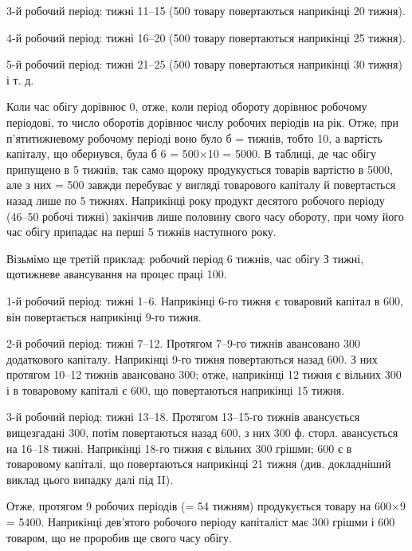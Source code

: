 3-й робочий період: тижні 11--15 (500 товару повертаються
наприкінці 20 тижня).

4-й робочий період: тижні 16--20 (500 товару повертаються
наприкінці 25 тижня).

5-й робочий період: тижні 21--25 (500 товару повертаються
наприкінці 30 тижня) і т. д.

Коли час обігу дорівнює 0, отже, коли період обороту дорівнює
робочому періодові, то число оборотів дорівнює числу робочих періодів
на рік.
Отже, при п’ятитижневому робочому періоді воно було б = 
тижнів, тобто 10, а вартість капіталу, що обернувся, була б 6 = 500×10 =
5000.
В таблиці, де час обігу припущено в 5 тижнів, так само щороку
продукується товарів вартістю в 5000, але з них  = 500 завжди перебуває у вигляді товарового капіталу й повертається
назад лише по 5 тижнях. Наприкінці року продукт десятого робочого
періоду (46--50 робочі тижні) закінчив лише половину свого часу
обороту, при чому його час обігу припадає на перші 5 тижнів наступного року.

Візьмімо ще третій приклад: робочий період 6 тижнів, час обігу
З тижні, щотижневе авансування на процес праці 100.

1-й робочий період: тижні 1--6. Наприкінці 6-го тижня є товаровий
капітал в 600, він повертається наприкінці 9-го тижня.

2-й робочий період: тижні 7--12. Протягом 7--9-го тижнів авансовано
300 додаткового капіталу. Наприкінці 9-го тижня повертаються
назад 600. З них протягом 10--12 тижнів авансовано 300; отже, наприкінці 12 тижня є вільних 300 і в товаровому
капіталі є 600, що повертаються наприкінці 15 тижня.

3-й робочий період: тижні 13--18. Протягом 13--15-го тижнів авансується
вищезгадані 300, потім повертаються назад 600,
з них 300 ф. сторл. авансується на 16--18 тижні. Наприкінці 18-го тижня
є вільних 300 грішми; 600 є в товаровому капіталі,
що повертаються наприкінці 21 тижня (див. докладніший виклад
цього випадку далі під II).

Отже, протягом 9 робочих періодів (= 54 тижням) продукується товару
на 600×9 = 5400. Наприкінці дев’ятого робочого періоду
капіталіст має 300 грішми і 600 товаром, що не
проробив ще свого часу обігу.

